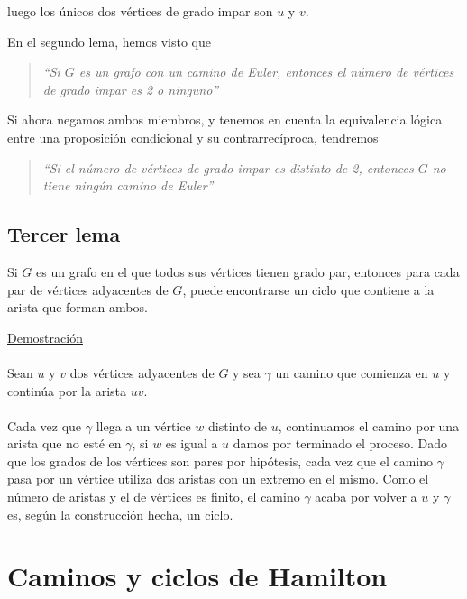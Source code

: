 luego los únicos dos vértices de grado impar son $u$ y $v$.\\

\begin{nota}
En el segundo lema, hemos visto que
\begin{quote}
\emph{``Si $G$ es un grafo con un camino de Euler, entonces el número de vértices de grado impar es 2 o ninguno''}
\end{quote}
Si ahora negamos ambos miembros, y tenemos en cuenta la equivalencia lógica entre una proposición condicional y su contrarrecíproca, tendremos
\begin{quote}
\emph{``Si el número de vértices de grado impar es distinto de 2, entonces $G$ no tiene ningún camino de Euler''}
\end{quote}
\end{nota}

\subsection{Tercer lema}

\begin{fondo}
Si $G$ es un grafo en el que todos sus vértices tienen grado par, entonces para cada par de vértices adyacentes de $G$, puede encontrarse un ciclo que contiene a la arista que forman ambos.
\end{fondo}

\underline{Demostración}\\
\\
Sean $u$ y $v$ dos vértices adyacentes de $G$ y sea $\gamma$ un camino que comienza en $u$ y continúa por la arista $uv$.\\
\\
Cada vez que $\gamma$ llega a un vértice $w$ distinto de $u$, continuamos el camino por una arista que no esté en $\gamma$, si $w$ es igual a $u$ damos por terminado el proceso. Dado que los grados de los vértices son pares por hipótesis, cada vez que el camino $\gamma$ pasa por un vértice utiliza dos aristas con un extremo en el mismo. Como el número de aristas y el de vértices es finito, el camino $\gamma$ acaba por volver a $u$ y $\gamma$ es, según la construcción hecha, un ciclo. \\


\section{Caminos y ciclos de Hamilton}

